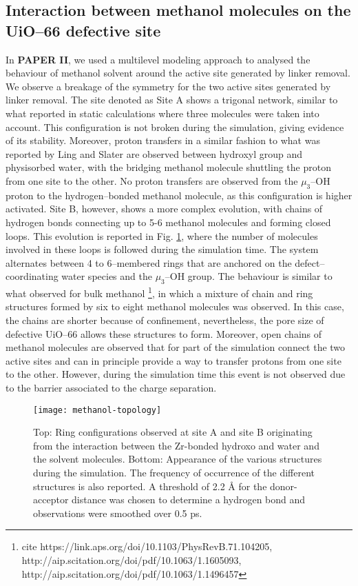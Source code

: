 \subsection{Interaction between methanol molecules on the UiO--66 defective site}
In \textbf{PAPER II}, we used a multilevel modeling approach to analysed the behaviour of methanol solvent around the active site generated by linker removal. We observe a breakage of the symmetry for the two active sites generated by linker removal. The site denoted as Site A shows a trigonal network, similar to what reported in static calculations where three molecules were taken into account. This configuration is not broken during the simulation, giving evidence of its stability. Moreover, proton transfers in a similar fashion to what was reported by Ling and Slater \cite{ling2016dynamic} are observed between hydroxyl group and physisorbed water, with the bridging methanol molecule shuttling the proton from one site to the other. No proton transfers are observed from the $\mu_3$--OH proton to the hydrogen--bonded methanol molecule, as this configuration is higher activated. Site B, however, shows a more complex evolution, with chains of hydrogen bonds connecting up to 5-6 methanol molecules and forming closed loops. This evolution is reported in Fig. \ref{fig:methanol-topology}, where the number of molecules involved in these loops is followed during the simulation time. The system alternates between 4 to 6--membered rings that are anchored on the defect--coordinating water species and the $\mu_3$--OH group. The behaviour is similar to what observed for bulk methanol \footnote{cite https://link.aps.org/doi/10.1103/PhysRevB.71.104205, http://aip.scitation.org/doi/pdf/10.1063/1.1605093, http://aip.scitation.org/doi/pdf/10.1063/1.1496457 }, in which a mixture of chain and ring structures formed by six to eight methanol molecules was observed. In this case, the chains are shorter because of confinement, nevertheless, the pore size of defective UiO--66 allows these structures to form. Moreover, open chains of methanol molecules are observed that for part of the simulation connect the two active sites and can in principle provide a way to transfer protons from one site to the other. However, during the simulation time this event is not observed due to the barrier associated to the charge separation. 

\begin{figure}[!htbp]
	\centering
	\texttt{[image: methanol-topology]}
	\caption{Top: Ring configurations observed at site A and site B originating from the interaction between the Zr-bonded hydroxo and water and the solvent molecules. Bottom: Appearance of the various structures during the simulation. The frequency of occurrence of the different structures is also reported. A threshold of 2.2 Å for the donor-acceptor distance was chosen to determine a hydrogen bond and observations were smoothed over 0.5 ps.}
	\label{fig:methanol-topology}
\end{figure}

